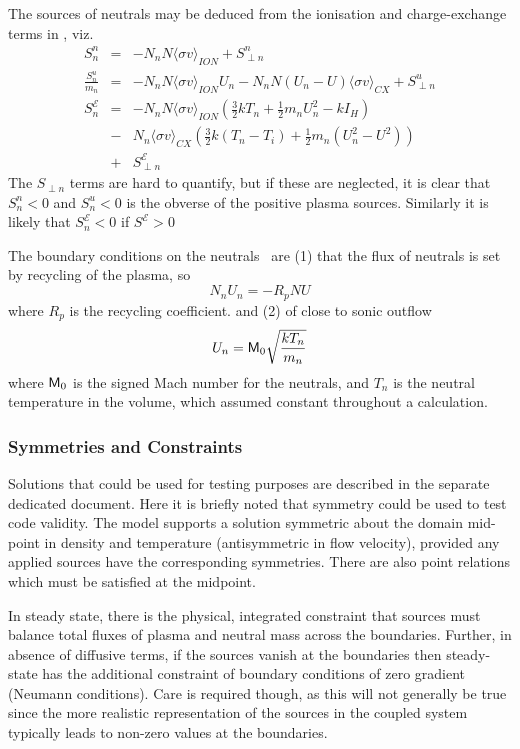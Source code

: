 The sources of neutrals may be deduced from the ionisation and charge-exchange terms in , viz.
\begin{eqnarray}
\label{eq:Snn} S^n_n&=&-N_n N \langle\sigma v\rangle_{ION} +S^n_{\perp n} \\
\label{eq:Sun} \frac{S^u_n}{m_n} &=&-N_n N \langle\sigma v\rangle_{ION} U_n - N_n N (U_n-U) \langle\sigma v\rangle_{CX} + S^u_{\perp n} \\
\label{eq:SEn} S^\mathcal{E}_n&=&
-N_n N \langle\sigma v\rangle_{ION} (\frac{3}{2} kT_n + \frac{1}{2} m_n U_n^2 -k I_H)\\
&-&N_n \langle\sigma v\rangle_{CX} \left(\frac{3}{2} k (T_n-T_i)  + \frac{1}{2} m_n (U_n^2-U^2)\right)\\
&+&S^\mathcal{E}_{\perp n} 
\end{eqnarray}
The $S_{\perp n}$ terms are hard to quantify, but if these are neglected,
it is clear that $S^n_n<0$ and $S^u_n<0$
is the obverse of the positive plasma sources. Similarly it is likely that $S^\mathcal{E}_n<0$ if $S^\mathcal{E}>0$

The boundary conditions on the neutrals~\cite[Table\,4]{Ha13Benc} are
(1) that the flux of neutrals is set by recycling of the plasma, so
\begin{equation}\label{eq:bcneutflux}
N_n U_n = - R_p N U
\end{equation}
where $R_p$ is the recycling coefficient.
and (2) of close to sonic outflow
\begin{equation}\label{eq:bcneutspeed}
U_n ={\sf M}_0\sqrt\frac{k T_n}{m_n}
\end{equation}
where ${\sf M}_0$ is the signed Mach number for the neutrals, and $T_n$ is the neutral temperature in the
volume, which assumed constant throughout a calculation.

\subsubsection{Symmetries and Constraints}\label{sec:constraint}
Solutions that could be used for testing purposes are described in the separate dedicated document.
Here it is briefly noted that symmetry could be used to test code validity. The model
supports a solution symmetric about the domain mid-point in density and temperature
(antisymmetric in flow velocity), provided any applied sources have the corresponding symmetries.
There are also point relations which must be satisfied at the midpoint.

In steady state, there is the physical, integrated constraint that sources must balance total
fluxes of plasma and neutral mass across the boundaries.
Further, in absence of diffusive terms, if the sources vanish at the boundaries
then steady-state has the additional constraint of boundary conditions
of zero gradient (Neumann conditions). Care is required though, as this will not generally be
true since the more realistic representation of the sources in the coupled system
typically leads to non-zero values at the boundaries.
